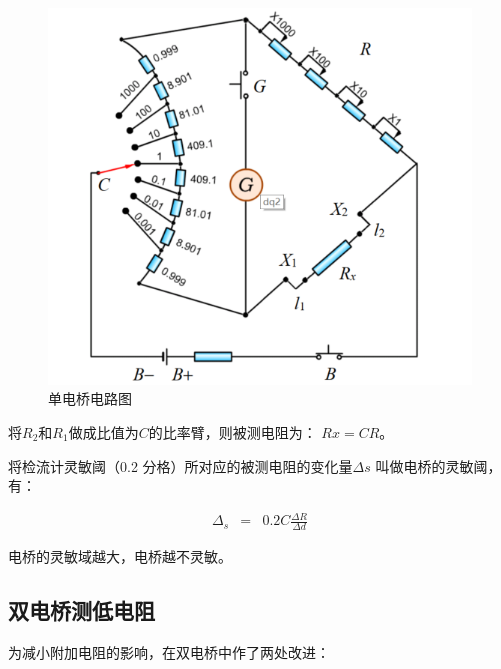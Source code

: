 \documentclass[UTF8]{ctexart}
\begin{document}
    \begin{figure}[h]
        \centering
        \includegraphics[scale=0.5]{单电桥.png}
        \caption{单电桥电路图}
        \label{fig:label}
    \end{figure}

    将$R_2$和$R_1$做成比值为$C$的比率臂，则被测电阻为：
    $Rx = CR$。

    将检流计灵敏阈（0.2 分格）所对应的被测电阻的变化量$\Delta s$ 叫做电桥的灵敏阈，有：
    
    \begin{eqnarray}
        \Delta_{s} & = & 0.2 C \frac{\Delta R}{\Delta d}
    \end{eqnarray}

    电桥的灵敏域越大，电桥越不灵敏。

    \subsection{双电桥测低电阻}

    为减小附加电阻的影响，在双电桥中作了两处改进：
\end{document}
